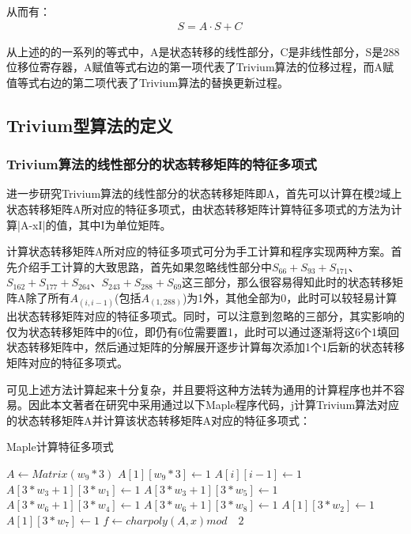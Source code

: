 从而有：
\begin{align}
\label{eq:struct}
& S = A \cdot S + C
\end{align}

从上述的的一系列的等式中，A是状态转移的线性部分，C是非线性部分，S是288位移位寄存器，A赋值等式右边的第一项代表了Trivium算法的位移过程，而A赋值等式右边的第二项代表了Trivium算法的替换更新过程。

\subsection{Trivium型算法的定义}

\subsubsection{Trivium算法的线性部分的状态转移矩阵的特征多项式}

进一步研究Trivium算法的线性部分的状态转移矩阵即A，首先可以计算在模2域上状态转移矩阵A所对应的特征多项式，由状态转移矩阵计算特征多项式的方法为计算|A-xI|的值，其中I为单位矩阵。

计算状态转移矩阵A所对应的特征多项式可分为手工计算和程序实现两种方案。首先介绍手工计算的大致思路，首先如果忽略线性部分中$S_{66} + S_{93} + S_{171}$、$S_{162} + S_{177} + S_{264}$、$S_{243} + S_{288} + S_{69}$这三部分，那么很容易得知此时的状态转移矩阵A除了所有$A_{(i,i-1)}$(包括$A_{(1,288)}$)为1外，其他全部为0，此时可以较轻易计算出状态转移矩阵对应的特征多项式。同时，可以注意到忽略的三部分，其实影响的仅为状态转移矩阵中的6位，即仍有6位需要置1，此时可以通过逐渐将这6个1填回状态转移矩阵中，然后通过矩阵的分解展开逐步计算每次添加1个1后新的状态转移矩阵对应的特征多项式。

可见上述方法计算起来十分复杂，并且要将这种方法转为通用的计算程序也并不容易。因此本文著者在研究中采用通过以下Maple程序代码，j计算Trivium算法对应的状态转移矩阵A并计算该状态转移矩阵A对应的特征多项式：

\begin{algorithm}[H]
  \caption{Maple计算特征多项式}
  \label{algo:trivium_maple_function}
  \begin{algorithmic}
      
	  \STATE $A \leftarrow Matrix(w_{9}*3)$
	  \STATE $A[1][w_{9}*3] \leftarrow 1$
	    \STATE $A[i][i - 1] \leftarrow 1$
	  \ENDFOR 
	  \STATE $A[3*w_{3}+1][3*w_{1}] \leftarrow 1$
	  \STATE $A[3*w_{3}+1][3*w_{5}] \leftarrow 1$
	  \STATE $A[3*w_{6}+1][3*w_{4}] \leftarrow 1$
	  \STATE $A[3*w_{6}+1][3*w_{8}] \leftarrow 1$
	  \STATE $A[1][3*w_{2}] \leftarrow 1$
	  \STATE $A[1][3*w_{7}] \leftarrow 1$
	  \STATE $f \leftarrow charpoly(A, x) mod \quad 2$

  \end{algorithmic}
\end{algorithm}


